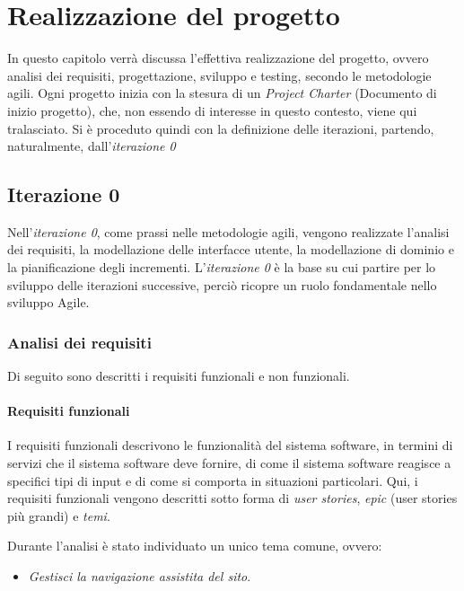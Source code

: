 
\chapter{Realizzazione del progetto}
\label{progetto}

In questo capitolo verrà discussa l'effettiva realizzazione del progetto, ovvero analisi dei requisiti, progettazione, sviluppo e testing, secondo le metodologie agili.
Ogni progetto inizia con la stesura di un \textit{Project Charter} (Documento di inizio progetto), che, non essendo di interesse in questo contesto, viene qui tralasciato.
Si è proceduto quindi con la definizione delle iterazioni, partendo, naturalmente, dall'\textit{iterazione 0}

\section{Iterazione 0}

Nell'\emph{iterazione 0}, come prassi nelle metodologie agili, vengono realizzate l'analisi dei requisiti, la modellazione delle interfacce utente, la modellazione di dominio e la pianificazione degli incrementi.
L'\emph{iterazione 0} è la base su cui partire per lo sviluppo delle iterazioni successive, perciò ricopre un ruolo fondamentale nello sviluppo Agile.

\subsection{Analisi dei requisiti}
Di seguito sono descritti i requisiti funzionali e non funzionali.

\subsubsection{Requisiti funzionali}
I requisiti funzionali descrivono le funzionalità del sistema software, in termini di servizi che il sistema software deve fornire, di come il sistema software reagisce a specifici tipi di input e di come si comporta in situazioni particolari.
Qui, i requisiti funzionali vengono descritti sotto forma di \textit{user stories}, \textit{epic} (user stories più grandi) e \textit{temi}.

Durante l'analisi è stato individuato un unico tema comune, ovvero:
\begin{itemize}
\item \textit{Gestisci la navigazione assistita del sito}.
\end{itemize}

